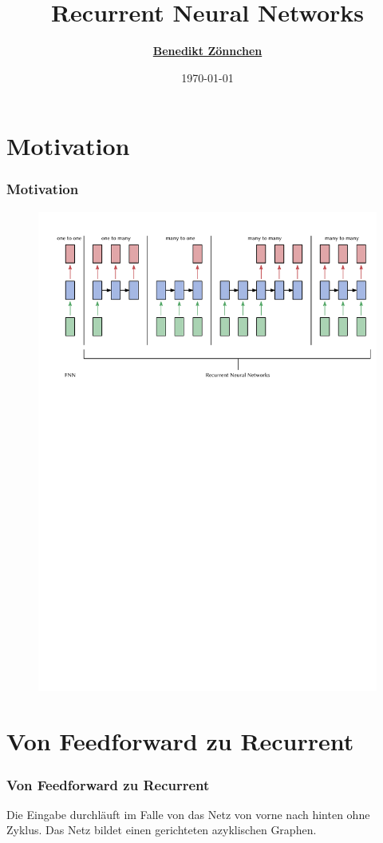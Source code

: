 \documentclass[german,aspectratio=169]{beamer}
\title{Recurrent Neural Networks}
\subtitle{}
\author{\href{mailto:zoennchen.benedikt@hm.edu}{\textbf{Benedikt Z\"onnchen}}}
\date{\today}
\begin{document}
	
\begin{frame}
	\titlepage
\end{frame}

\section{Motivation}
\begin{frame}
	\frametitle{Motivation}
	\begin{figure}
		\includegraphics[width=\textwidth]{FNN-vs-RNN}
	\end{figure}
\end{frame}


\section{Von Feedforward zu Recurrent}
\begin{frame}
	\frametitle{Von Feedforward zu Recurrent}
	Die Eingabe durchläuft im Falle von  das Netz von vorne nach hinten ohne Zyklus.
	Das Netz bildet einen gerichteten azyklischen Graphen.
\end{frame}
\end{document}
